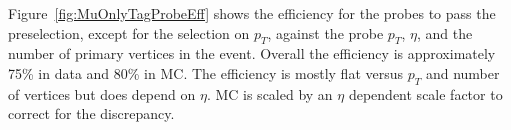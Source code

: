 


Figure~\ref{fig:MuOnlyTagProbeEff} shows the efficiency for the probes
to pass the preselection, except for the selection on $p_T$, against the probe
$p_T$, $\eta$, and the number of primary vertices in the event.
Overall the efficiency is approximately 75\% in data and 80\% in MC.
The efficiency is mostly flat versus $p_T$ and number of vertices but does depend
on $\eta$.  MC is scaled by an $\eta$ dependent scale factor to correct for the discrepancy.

